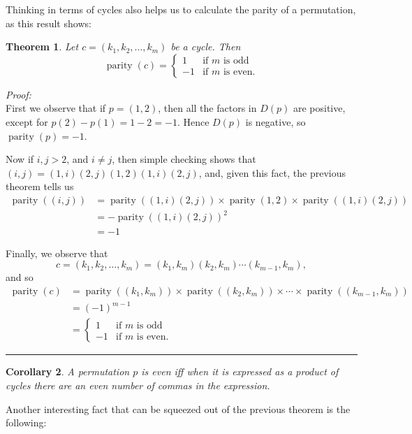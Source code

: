\documentclass[10pt]{book}
\theoremstyle{break}
\newtheorem{theorem}{Theorem}[section]
\newtheorem{corollary}[theorem]{Corollary}
\newenvironment{proof}[1][]%
{\par\noindent\textit{Proof\ifthenelse{\equal{#1}{}}{}{
(#1)}:}\\\hspace*{\parindent}}%
{\hfill\rule{2ex}{2ex}\par\vspace{\theorempostskipamount}}
\newcommand{\parity}{\operatorname{parity}}
\begin{document}
Thinking in terms of cycles also helps us to calculate the parity of a
permutation, as this result shows:

\begin{theorem}
  Let $c = (k_{1}, k_{2}, \ldots, k_{m})$ be a cycle.  Then
  \[
    \parity(c) = \begin{cases}
      1 & \text{if $m$ is odd} \\
      -1 & \text{if $m$ is even}.
    \end{cases}
  \]
\end{theorem}
\begin{proof}
  First we observe that if $p = (1, 2)$, then all the factors in $D(p)$
  are positive, except for $p(2) - p(1) = 1 - 2 = -1$.  Hence $D(p)$ is
  negative, so $\parity(p) = -1$.
  
  Now if $i, j > 2$, and $i \ne j$, then simple checking shows that
  $(i,j) = (1,i)(2,j)(1,2)(1,i)(2,j)$,
  and, given this fact, the previous theorem tells us
  \begin{align*}
    \parity((i,j)) &= \parity((1,i)(2,j)) \times \parity(1,2) \times \parity((1,i)(2,j)) \\
    &= -\parity((1,i)(2,j))^{2}\\
    &= -1
  \end{align*}
  
  Finally, we observe that
  \begin{equation}\label{eqn:cycleproduct}
    c = (k_{1}, k_{2}, \ldots, k_{m}) = (k_{1}, k_{m})(k_{2}, k_{m})\cdots (k_{m-1}, k_{m}),
  \end{equation}
  and so
  \begin{align*}
    \parity(c) &= \parity((k_{1}, k_{m})) \times \parity((k_{2}, k_{m})) \times \cdots \times \parity((k_{m-1}, k_{m}))\\
    &= (-1)^{m-1} \\
    &= \begin{cases}
    1 & \text{if $m$ is odd} \\
    -1 & \text{if $m$ is even.}
    \end{cases}
  \end{align*}
\end{proof}

\begin{corollary}
  A permutation $p$ is even iff when it is expressed as a product of
  cycles there are an even number of commas in the expression.
\end{corollary}

Another interesting fact that can be squeezed out of the previous theorem
is the following:
\end{document}

